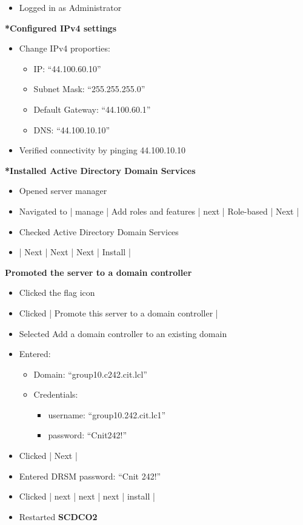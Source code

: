 \documentclass[letterpaper]{article}
\begin{document}
\begin{enumerate}
\begin{itemize}
\item Logged in as Administrator
\end{itemize}
\textbf{*Configured IPv4 settings}
\begin{itemize}
\item Change IPv4 proporties:
\begin{itemize}
\item IP: ``44.100.60.10''
\item Subnet Mask: ``255.255.255.0''
\item Default Gateway: ``44.100.60.1''
\item DNS: ``44.100.10.10''
\end{itemize}
\item Verified connectivity by pinging 44.100.10.10
\end{itemize}
\textbf{*Installed Active Directory Domain Services}
\begin{itemize}
\item Opened server manager
\item Navigated to | manage | Add roles and features | next | Role-based | Next |
\item Checked Active Directory Domain Services
\item | Next | Next | Next | Install |
\end{itemize}
\textbf{Promoted the server to a domain controller}
\begin{itemize}
\item Clicked the flag icon
\item Clicked | Promote this server to a domain controller |
\item Selected Add a domain controller to an existing domain
\item Entered:
\begin{itemize}
\item Domain: ``group10.c242.cit.lcl''
\item Credentials:
\begin{itemize}
\item username: ``group10.242.cit.lc1\Administrator''
\item password: ``Cnit242!''
\end{itemize}
\end{itemize}
\item Clicked | Next |
\item Entered DRSM password: ``Cnit 242!''
\item Clicked | next | next | next | install |
\item Restarted \textbf{SCDCO2}

\end{itemize}
\end{enumerate}
\end{document}
